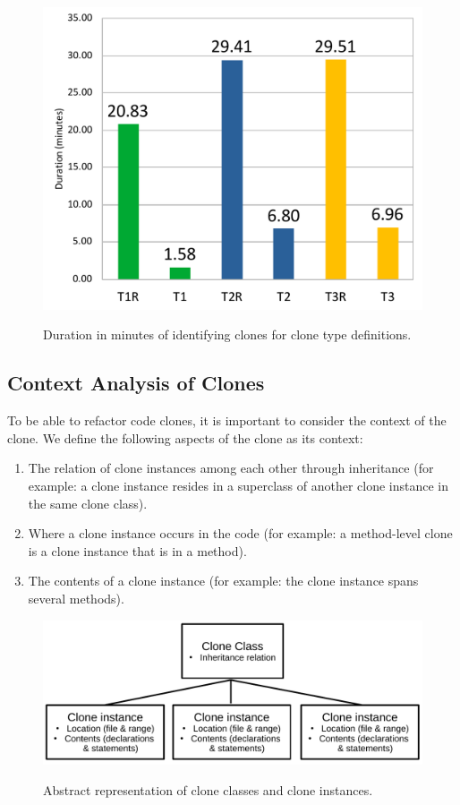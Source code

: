 \documentclass[a4paper]{article}
\begin{document}
\begin{figure}[H]
  \caption{Duration in minutes of identifying clones for clone type definitions.}
    \includegraphics[width=.9\columnwidth]{img/DurationChart}
  \label{fig:performance}
\end{figure}

\subsection{Context Analysis of Clones}\label{chap:clonecontextexpl}
To be able to refactor code clones, it is important to consider the context of the clone. We define the following aspects of the clone as its context:
\begin{enumerate}
  \item The relation of clone instances among each other through inheritance (for example: a clone instance resides in a superclass of another clone instance in the same clone class).
  \item Where a clone instance occurs in the code (for example: a method-level clone is a clone instance that is in a method).
  \item The contents of a clone instance (for example: the clone instance spans several methods).
\end{enumerate}

\begin{figure}[H]
  \caption{Abstract representation of clone classes and clone instances.}
    \medskip
    \includegraphics[width=1\columnwidth]{img/context}
  \label{fig:clonecontext}
\end{figure}
\end{document}
